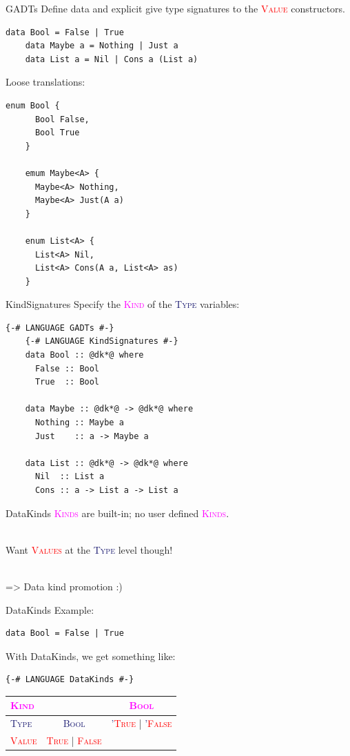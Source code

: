 \documentclass[xcolor={usenames,dvipsnames}]{beamer}
\newcommand{\htycon}[1]{\textcolor{MidnightBlue}{\textsc{#1}}}
\newcommand{\hvalcon}[1]{\textcolor{Red}{\textsc{#1}}}
\newcommand{\hkind}[1]{\textcolor{Fuchsia}{\textsc{#1}}}
\begin{document}
\begin{frame}[fragile]{GADTs}
  Define data and explicit give type signatures to the \hvalcon{Value} constructors.
  \begin{lstlisting}[style=hask]
    data Bool = False | True
    data Maybe a = Nothing | Just a
    data List a = Nil | Cons a (List a)
  \end{lstlisting}

  Loose translations:
  \begin{lstlisting}[style=hask]
    enum Bool {
      Bool False,
      Bool True
    }

    emum Maybe<A> {
      Maybe<A> Nothing,
      Maybe<A> Just(A a)
    }

    enum List<A> {
      List<A> Nil,
      List<A> Cons(A a, List<A> as)
    }
  \end{lstlisting}
\end{frame}

\begin{frame}[fragile]{KindSignatures}
  Specify the \hkind{Kind} of the \htycon{Type} variables:
  \begin{lstlisting}[style=hask]
    {-# LANGUAGE GADTs #-}
    {-# LANGUAGE KindSignatures #-}
    data Bool :: @dk*@ where
      False :: Bool
      True  :: Bool

    data Maybe :: @dk*@ -> @dk*@ where
      Nothing :: Maybe a
      Just    :: a -> Maybe a

    data List :: @dk*@ -> @dk*@ where
      Nil  :: List a
      Cons :: a -> List a -> List a
  \end{lstlisting}
\end{frame}

\begin{frame}[fragile]{DataKinds}
  \hkind{Kinds} are built-in; no user defined \hkind{Kinds}.

  \ \\
  \pause
  Want \hvalcon{Values} at the \htycon{Type} level though!

  \ \\
  \pause
  => Data kind promotion :)
\end{frame}

\begin{frame}[fragile]{DataKinds}
  Example:
  \begin{lstlisting}[style=hask]
    data Bool = False | True
  \end{lstlisting}

  With DataKinds, we get something like:
  \begin{lstlisting}[style=hask]
    {-# LANGUAGE DataKinds #-}
  \end{lstlisting}
  \begin{tabular}{l || c | c}
    \hkind{Kind} & \ & \hkind{Bool} \\
    \hline \htycon{Type} & \htycon{Bool} & \htycon{'}\hvalcon{True} | \htycon{'}\hvalcon{False} \\
    \hline \hvalcon{Value} & \hvalcon{True} | \hvalcon{False} & \ \\
  \end{tabular}
\end{frame}
\end{document}
